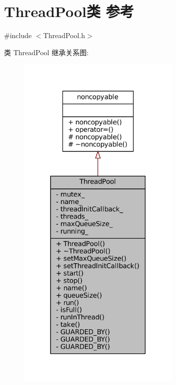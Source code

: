 \hypertarget{classmuduo_1_1ThreadPool}{}\section{Thread\+Pool类 参考}
\label{classmuduo_1_1ThreadPool}


{\ttfamily \#include $<$Thread\+Pool.\+h$>$}



类 Thread\+Pool 继承关系图\+:
\nopagebreak
\begin{figure}[H]
\begin{center}
\leavevmode
\includegraphics[width=222pt]{classmuduo_1_1ThreadPool__inherit__graph}
\end{center}
\end{figure}



